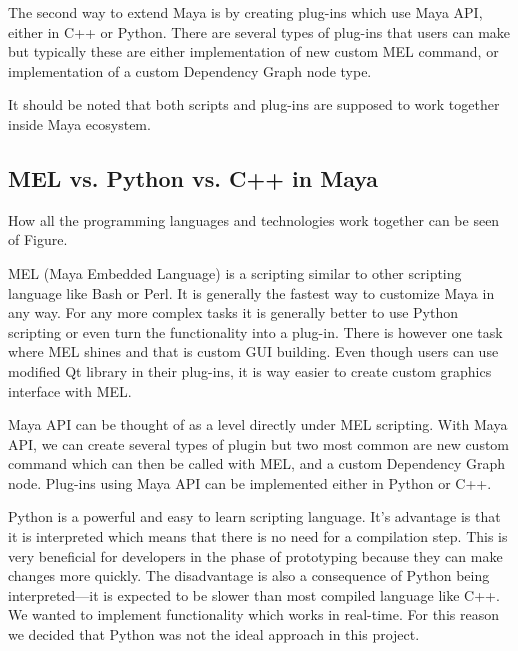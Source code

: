 \documentclass[
  digital, %
  table,   %
  nolof,     %
  nolot,     %
]{fithesis3}
\begin{document}
The second way to extend Maya is by creating plug-ins which use Maya API, either in C++ or Python. There are several types of plug-ins that users can make but typically these are either implementation of new custom MEL command, or implementation of a custom Dependency Graph node type.

It should be noted that both scripts and plug-ins are supposed to work together inside Maya ecosystem.



\subsection{MEL vs. Python vs. C++ in Maya}
How all the programming languages and technologies work together can be seen of Figure.

MEL (Maya Embedded Language) is a scripting similar to other scripting language like Bash or Perl. It is generally the fastest way to customize Maya in any way. For any more complex tasks it is generally better to use Python scripting or even turn the functionality into a plug-in. There is however one task where MEL shines and that is custom GUI building. Even though users can use modified Qt library in their plug-ins, it is way easier to create custom graphics interface with MEL.

Maya API can be thought of as a level directly under MEL scripting. With Maya API, we can create several types of plugin but two most common are new custom command which can then be called with MEL, and a custom Dependency Graph node. Plug-ins using Maya API can be implemented either in Python or C++.

Python is a powerful and easy to learn scripting language. It's advantage is that it is interpreted which means that there is no need for a compilation step. This is very beneficial for developers in the phase of prototyping because they can make changes more quickly. The disadvantage is also a consequence of Python being interpreted—it is expected to be slower than most compiled language like C++. We wanted to implement functionality which works in real-time. For this reason we decided that Python was not the ideal approach in this project.
\end{document}
